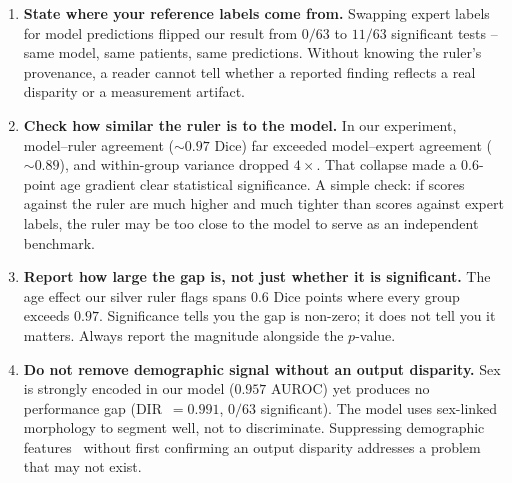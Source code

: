 \begin{enumerate}
\item \textbf{State where your reference labels come from.}
  Swapping expert labels for model predictions flipped our result from $0/63$ to
  $11/63$ significant tests -- same model, same patients, same predictions.
  Without knowing the ruler's provenance, a reader cannot tell whether a reported
  finding reflects a real disparity or a measurement artifact.

\item \textbf{Check how similar the ruler is to the model.}
  In our experiment, model--ruler agreement (${\sim}0.97$ Dice) far exceeded
  model--expert agreement (${\sim}0.89$), and within-group variance dropped
  $4\times$. That collapse made a $0.6$-point age gradient clear statistical
  significance. A simple check: if scores against the ruler are much higher and
  much tighter than scores against expert labels, the ruler may be too close to
  the model to serve as an independent benchmark.

\item \textbf{Report how large the gap is, not just whether it is significant.}
  The age effect our silver ruler flags spans $0.6$ Dice points where every group
  exceeds $0.97$. Significance tells you the gap is non-zero; it does not tell
  you it matters. Always report the magnitude alongside the $p$-value.

\item \textbf{Do not remove demographic signal without an output disparity.}
  Sex is strongly encoded in our model ($0.957$ AUROC) yet produces no
  performance gap (DIR~$= 0.991$, $0/63$ significant). The model uses sex-linked
  morphology to segment well, not to discriminate. Suppressing demographic
  features~\cite{petersen2023feature} without first confirming an output disparity
  addresses a problem that may not exist.
\end{enumerate}

